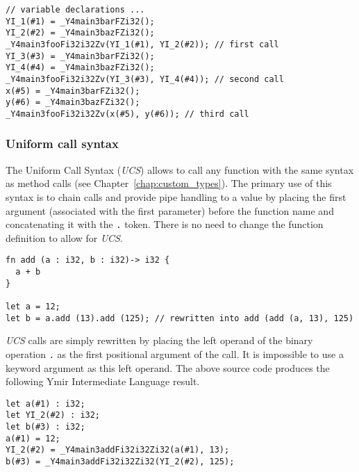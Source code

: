 \begin{lstlisting}[style=intermediateVerb]
// variable declarations ...
YI_1(#1) = _Y4main3barFZi32();
YI_2(#2) = _Y4main3bazFZi32();
_Y4main3fooFi32i32Zv(YI_1(#1), YI_2(#2)); // first call
YI_3(#3) = _Y4main3barFZi32();
YI_4(#4) = _Y4main3bazFZi32();
_Y4main3fooFi32i32Zv(YI_3(#3), YI_4(#4)); // second call
x(#5) = _Y4main3barFZi32();
y(#6) = _Y4main3bazFZi32();
_Y4main3fooFi32i32Zv(x(#5), y(#6)); // third call
\end{lstlisting}

\subsubsection {Uniform call syntax}

The Uniform Call Syntax (\textit{UCS}) allows to call any function with the same
syntax as method calls (see Chapter~\ref{chap:custom_types}). The primary use of
this syntax is to chain calls and provide pipe handling to a value by placing
the first argument (associated with the first parameter) before the function
name and concatenating it with the \texttt{.} token. There is no need to change
the function definition to allow for \textit{UCS}.

\begin{lstlisting}[style=coloredverbatim]
fn add (a : i32, b : i32)-> i32 {
  a + b
}

let a = 12;
let b = a.add (13).add (125); // rewritten into add (add (a, 13), 125)
\end{lstlisting}

\textit{UCS} calls are simply rewritten by placing the left operand of the
binary operation \texttt{.} as the first positional argument of the call. It is
impossible to use a keyword argument as this left operand. The above source code
produces the following Ymir Intermediate Language result.

\begin{lstlisting}[style=intermediateVerb]
let a(#1) : i32;
let YI_2(#2) : i32;
let b(#3) : i32;
a(#1) = 12;
YI_2(#2) = _Y4main3addFi32i32Zi32(a(#1), 13);
b(#3) = _Y4main3addFi32i32Zi32(YI_2(#2), 125);
\end{lstlisting}


